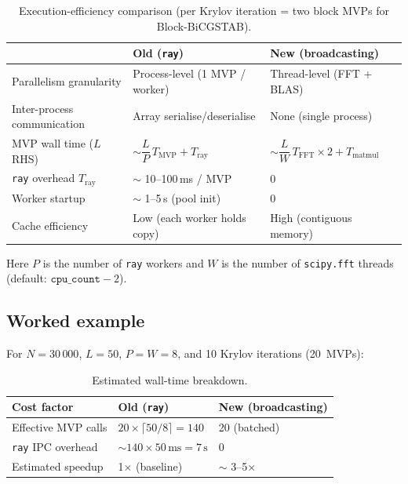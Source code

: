 \documentclass[11pt,a4paper]{article}
\begin{document}
\begin{table}[htbp]
\centering
\caption{Execution-efficiency comparison (per Krylov iteration =
  two block MVPs for Block-BiCGSTAB).}
\label{tab:perf-compare}
\begin{tabular}{@{}lll@{}}
\toprule
  & Old (\texttt{ray}) & New (broadcasting) \\
\midrule
Parallelism granularity
  & Process-level (1 MVP / worker)
  & Thread-level (FFT + BLAS) \\
Inter-process communication
  & Array serialise/deserialise
  & None (single process) \\
MVP wall time ($L$ RHS)
  & $\sim \dfrac{L}{P}\,T_{\text{MVP}} + T_{\text{ray}}$
  & $\sim \dfrac{L}{W}\,T_{\text{FFT}} \times 2 + T_{\text{matmul}}$ \\
\texttt{ray} overhead $T_{\text{ray}}$
  & $\sim$ 10--100\,ms / MVP
  & 0 \\
Worker startup
  & $\sim$ 1--5\,s (pool init)
  & 0 \\
Cache efficiency
  & Low (each worker holds copy)
  & High (contiguous memory) \\
\bottomrule
\end{tabular}
\end{table}

Here $P$ is the number of \texttt{ray} workers and $W$ is the number
of \texttt{scipy.fft} threads (default: $\texttt{cpu\_count} - 2$).

\subsection{Worked example}
\label{sec:perf-example}

For $N = 30\,000$, $L = 50$, $P = W = 8$, and 10 Krylov iterations
(20~MVPs):

\begin{table}[htbp]
\centering
\caption{Estimated wall-time breakdown.}
\label{tab:perf-example}
\begin{tabular}{@{}lll@{}}
\toprule
Cost factor & Old (\texttt{ray}) & New (broadcasting) \\
\midrule
Effective MVP calls
  & $20 \times \lceil 50/8 \rceil = 140$
  & 20 (batched) \\
\texttt{ray} IPC overhead
  & $\sim 140 \times 50\,\text{ms} = 7\,\text{s}$
  & 0 \\
Estimated speedup
  & 1$\times$ (baseline)
  & $\sim$ 3--5$\times$ \\
\bottomrule
\end{tabular}
\end{table}
\end{document}
